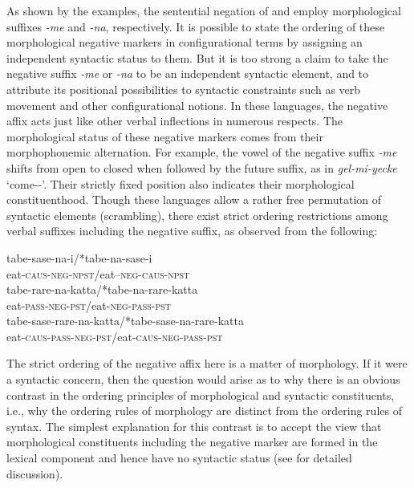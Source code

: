 \documentclass[output=paper
	        ,collection
	        ,collectionchapter
 	        ,biblatex
                ,babelshorthands
                ,newtxmath
                ,draftmode
                ,colorlinks, citecolor=brown
]{langscibook}
\begin{document}
\begin{exe}
\begin{xlist}
\begin{exe}
\begin{xlist}
\noindent
As shown by the examples, the sentential negation of 
and  employ
morphological suffixes \textit{-me} and \textit{-na},
respectively.
It is possible to state the ordering
of these morphological negative markers in configurational
terms by assigning an independent syntactic status to them.
But it is too strong a claim to
take the negative suffix \textit{-me} or \textit{-na}  to be an independent syntactic element,
and to attribute its positional possibilities to syntactic constraints
such as verb movement and other configurational notions.
%
In these languages, the negative affix acts just like
other verbal inflections in numerous respects.
%
%
%
%
%
The morphological status of
these negative markers comes from their morphophonemic alternation.
For example, the vowel of the  negative suffix \textit{-me} shifts from open to closed when followed by the
future suffix, as in \textit{gel-mi-yecke} `come-\NEG-\FUT'.  Their
strictly fixed position also indicates their morphological
constituenthood. Though these languages allow a rather free permutation of
syntactic elements (scrambling), there exist strict ordering restrictions among
verbal suffixes including the negative suffix, as observed from the following:

\eal
\ex
\gll tabe-sase-na-i/*tabe-na-sase-i \\
     eat-\textsc{caus}-\textsc{neg}-\textsc{npst}/eat--\textsc{neg}-\textsc{caus}-\textsc{npst} \\

\ex
\gll tabe-rare-na-katta/*tabe-na-rare-katta \\
     eat-\textsc{pass}-\textsc{neg}-\textsc{pst}/eat-\textsc{neg}-\textsc{pass}-\textsc{pst} \\

\ex
\gll tabe-sase-rare-na-katta/*tabe-sase-na-rare-katta \\
     eat-\textsc{caus}-\textsc{pass}-\textsc{neg}-\textsc{pst}/eat-\textsc{caus}-\textsc{neg}-\textsc{pass}-\textsc{pst}\\
\zl

\noindent
The strict ordering of the negative affix here is a matter of morphology.
If it were a syntactic concern, then
the question would arise as to why
there is an obvious contrast in the ordering principles
of morphological and syntactic constituents, i.e., why the ordering
rules of morphology are distinct from the ordering rules of syntax. The
simplest explanation for this contrast is to accept
the view that morphological constituents including the negative marker
are formed in the lexical component and hence have no syntactic
status (see \citealt[Chapter~2]{Kim:00} for detailed discussion).


\end{xlist}
\end{exe}
\end{xlist}
\end{exe}
\end{document}
